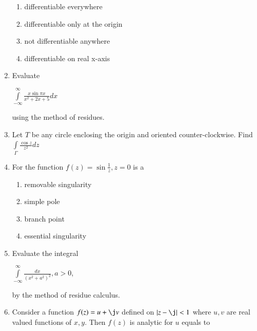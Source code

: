 \documentclass[journal,12pt,twocolumn]{IEEEtran}
\begin{document}
\begin{enumerate}[1.]
\begin{enumerate}
\item 
differentiable everywhere

\item 
differentiable only at the origin

\item 
not differentiable anywhere

\item 
differentiable on real x-axis

\end{enumerate}

\item Evaluate

$\int\limits_{- \infty}^{\infty} \frac{x \sin \pi x}{x^2+2x+5} dx $

using the method of residues.

\item Let $T$ be any circle enclosing the origin and oriented counter-clockwise.
Find $ \int\limits_{\Gamma} \frac{\cos z}{z^2} dz $ 

%
%
%
%
%


\item For the function $f(z) = \sin \frac{1}{z} , z=0 $ is a

\begin{enumerate}

\item 
removable singularity

\item 
simple pole

\item 
branch point

\item 
essential singularity

\end{enumerate}


\item Evaluate the integral 

$\int\limits_{- \infty}^{\infty} \frac{dx}{{(x^2+a^2)}^2} , a>0 $,

by the method of residue calculus.

\item Consider a function $f(z)=u + \j v$ defined on $ \abs{z - \j} < 1 $ where $ u,v $ are real valued functions of $ x,y $. Then $f(z)$ is analytic for $u$ equals to


\end{enumerate}
\end{document}
